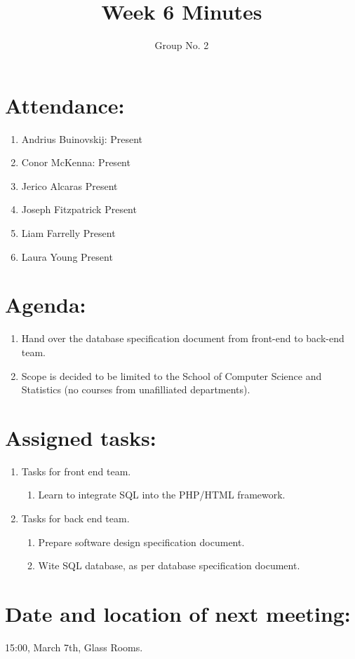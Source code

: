\documentclass[a4paper, 12pt]{article}
\begin{document}
\title{Week 6 Minutes}
\author{Group No. 2}
\maketitle

	\section{Attendance:}
		\begin{enumerate}[label*=\arabic*.]
			\item Andrius Buinovskij:	\dotfill Present
			\item Conor McKenna:		\dotfill Present
			\item Jerico Alcaras		\dotfill Present
			\item Joseph Fitzpatrick	\dotfill Present
			\item Liam Farrelly		\dotfill Present
			\item Laura Young		\dotfill Present
		\end{enumerate}

	\section{Agenda:}
		\begin{enumerate}[label*=\arabic*.]
			\item Hand over the database specification document from front-end to back-end team.
			\item Scope is decided to be limited to the School of Computer Science and Statistics (no courses from unafilliated departments).
		\end{enumerate}

	\newpage
	\section{Assigned tasks:}
		\begin{enumerate}[label*=\arabic*.]
			\item Tasks for front end team.
			\begin{enumerate}[label*=\arabic*.]
				\item Learn to integrate SQL into the PHP/HTML framework.
			\end{enumerate}
			\item Tasks for back end team.
			\begin{enumerate}[label*=\arabic*.]
				\item Prepare software design specification document.
				\item Wite SQL database, as per database specification document.
			\end{enumerate}
		\end{enumerate}

	\section{Date and location of next meeting:}
		15:00, March 7th, Glass Rooms.
\end{document}
